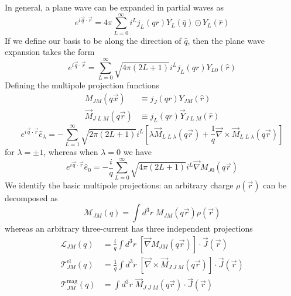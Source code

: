 \documentclass{book}[12pt]
\begin{document}
In general, a plane wave can be expanded in partial waves as
\begin{equation}
e^{i\vec{q}\cdot\vec{r}}=4\pi \sum_{L=0}^{\infty}i^Lj_L(qr)Y_L(\hat{q})\odot Y_L(\hat{r})
\end{equation}
If we define our basis to be along the direction of $\hat{q}$, then the plane wave expansion takes the form
\begin{equation}
e^{i\vec{q}\cdot\vec{r}}=\sum_{L=0}^{\infty}\sqrt{4\pi(2L+1)}i^Lj_L(qr)Y_{L0}(\hat{r})
\end{equation}
Defining the multipole projection functions
\begin{equation}
\begin{split}
M_{JM}(q\vec{x})&\equiv j_J(qr)Y_{JM}(\hat{r})\\
\vec{M}_{J\;L\;M}(q\vec{r})&\equiv j_L(qr)\vec{Y}_{J\;L\;M}(\hat{r})
\end{split}
\end{equation}
\begin{equation}
e^{i\vec{q}\cdot\vec{r}}\hat{e}_{\lambda}=-\sum_{L=1}^{\infty}\sqrt{2\pi(2L+1)}i^L\left[\lambda \vec{M}_{L\;L\;\lambda}(q\vec{r})+\frac{1}{q}\vec{\nabla}\times\vec{M}_{L\;L\;\lambda}(q\vec{r})\right]
\end{equation}
for $\lambda = \pm 1$, whereas when $\lambda = 0$ we have
\begin{equation}
e^{i\vec{q}\cdot\vec{r}}\hat{e}_0=-\frac{i}{q}\sum_{L=0}^{\infty}\sqrt{4\pi(2L+1)}i^L\vec{\nabla}M_{J0}(q\vec{r})
\end{equation}
We identify the basic multipole projections: an arbitrary charge $\rho(\vec{r})$ can be decomposed as
\begin{equation}
\mathcal{M}_{JM}(q)=\int d^3r\;M_{JM}(q\vec{r})\rho(\vec{r})
\end{equation}
whereas an arbitrary three-current has three independent projections 
\begin{equation}
\begin{split}
\mathcal{L}_{JM}(q)&=\frac{i}{q}\int d^3r\;\left[\vec{\nabla}M_{JM}(q\vec{r})\right]\cdot\vec{J}(\vec{r})\\
\mathcal{T}^\mathrm{el}_{JM}(q)&=\frac{1}{q}\int d^3r\;\left[\vec{\nabla}\times\vec{M}_{J\;J\;M}(q\vec{r})\right]\cdot\vec{J}(\vec{r})\\
\mathcal{T}^\mathrm{mag}_{JM}(q)&=\int d^3r\;\vec{M}_{J\;J\;M}(q\vec{r})\cdot\vec{J}(\vec{r})
\end{split}
\end{equation}
\end{document}

